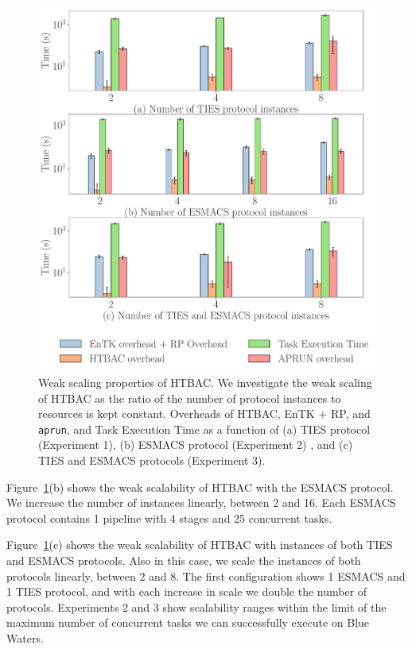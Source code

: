 \begin{figure}
  \centering
    \includegraphics[width=\columnwidth]{figures/ws_all.pdf}
    \caption{Weak scaling properties of HTBAC. We investigate the weak
    scaling of HTBAC as the ratio of the number of protocol instances to
    resources is kept constant. Overheads of HTBAC, EnTK + RP, and
    \texttt{aprun}, and Task Execution Time as a function of (a) TIES
    protocol (Experiment 1), (b) ESMACS protocol (Experiment 2) , and (c)
    TIES and ESMACS protocols (Experiment 3).}
\label{fig:ws}
\end{figure}

Figure~\ref{fig:ws}(b) shows the weak scalability of HTBAC with the ESMACS
protocol. We increase the number of instances linearly, between 2 and 16.
Each ESMACS protocol contains 1 pipeline with 4 stages and 25 concurrent
tasks.

Figure~\ref{fig:ws}(c) shows the weak scalability of HTBAC with instances of
both TIES and ESMACS protocols. Also in this case, we scale the instances of
both protocols linearly, between 2 and 8. The first configuration shows 1
ESMACS and 1 TIES protocol, and with each increase in scale we double the
number of protocols. Experiments 2 and 3 show scalability ranges within the
limit of the maximum number of concurrent tasks we can successfully execute
on Blue Waters. 

